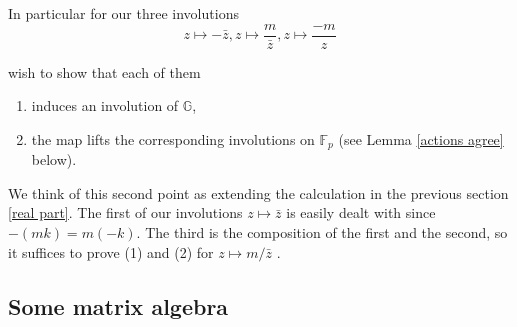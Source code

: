 \documentclass[12pt,a4paper]{amsart}
\def\GG{\mathbb{G}}
\def\fp{\mathbb{F}_p}
\begin{document}




In particular 
for our  
three involutions
	$$z\mapsto - \bar{z}, z\mapsto \frac{m}{\bar{z}} ,z\mapsto \frac{-m}{z}$$


wish to show that each of them
\begin{enumerate}

	\item induces an involution of $\GG$,
	\item the map lifts the corresponding
	involutions on $\fp$ (see Lemma \ref{actions agree}
	below).

\end{enumerate}
We think of this second point as extending the calculation in the previous section
\ref{real part}.
The first of our involutions $z\mapsto\bar{z}$ 
is easily dealt with since $-(mk) = m(-k)$.
The third is the composition of the first and the second,
so it suffices to prove (1) and (2) for 
$z\mapsto m  / \bar{z}$
.

\subsection{Some matrix algebra}
\end{document}
